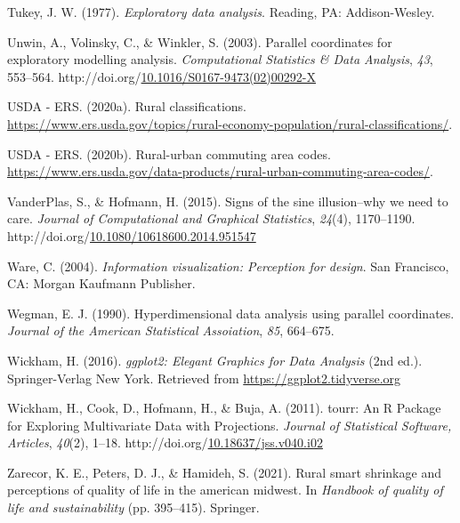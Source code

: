 \documentclass[print]{nuthesis}
\newlength{\cslhangindent}
\newenvironment{CSLReferences}[2]%
{\setlength{\parindent}{0pt}%
\everypar{\setlength{\hangindent}{\cslhangindent}}\ignorespaces}%
{\par}
\begin{document}
\begin{CSLReferences}{1}{0}
\leavevmode{}%
Tukey, J. W. (1977). \emph{Exploratory data analysis}. Reading, PA: Addison-Wesley.

\leavevmode{}%
Unwin, A., Volinsky, C., \& Winkler, S. (2003). Parallel coordinates for exploratory modelling analysis. \emph{Computational Statistics \& Data Analysis}, \emph{43}, 553--564. http://doi.org/\href{https://doi.org/10.1016/S0167-9473(02)00292-X}{10.1016/S0167-9473(02)00292-X}

\leavevmode{}%
USDA - ERS. (2020a). Rural classifications. \url{https://www.ers.usda.gov/topics/rural-economy-population/rural-classifications/}.

\leavevmode{}%
USDA - ERS. (2020b). Rural-urban commuting area codes. \url{https://www.ers.usda.gov/data-products/rural-urban-commuting-area-codes/}.

\leavevmode{}%
VanderPlas, S., \& Hofmann, H. (2015). Signs of the sine illusion--why we need to care. \emph{Journal of Computational and Graphical Statistics}, \emph{24}(4), 1170--1190. http://doi.org/\href{https://doi.org/10.1080/10618600.2014.951547}{10.1080/10618600.2014.951547}

\leavevmode{}%
Ware, C. (2004). \emph{Information visualization: Perception for design}. San Francisco, CA: Morgan Kaufmann Publisher.

\leavevmode{}%
Wegman, E. J. (1990). {Hyperdimensional data analysis using parallel coordinates}. \emph{Journal of the American Statistical Assoiation}, \emph{85}, 664--675.

\leavevmode{}%
Wickham, H. (2016). \emph{{ggplot2: Elegant Graphics for Data Analysis}} (2nd ed.). Springer-Verlag New York. Retrieved from \url{https://ggplot2.tidyverse.org}

\leavevmode{}%
Wickham, H., Cook, D., Hofmann, H., \& Buja, A. (2011). {tourr: An R Package for Exploring Multivariate Data with Projections}. \emph{Journal of Statistical Software, Articles}, \emph{40}(2), 1--18. http://doi.org/\href{https://doi.org/10.18637/jss.v040.i02}{10.18637/jss.v040.i02}

\leavevmode{}%
Zarecor, K. E., Peters, D. J., \& Hamideh, S. (2021). Rural smart shrinkage and perceptions of quality of life in the american midwest. In \emph{Handbook of quality of life and sustainability} (pp. 395--415). Springer.

\end{CSLReferences}
\end{document}
